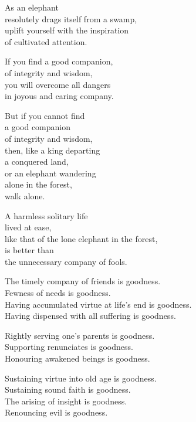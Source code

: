 As an elephant\\
resolutely drags itself from a swamp,\\
uplift yourself with the inspiration\\
of cultivated attention.


If you find a good companion,\\
of integrity and wisdom,\\
you will overcome all dangers\\
in joyous and caring company.


But if you cannot find\\
a good companion\\
of integrity and wisdom,\\
then, like a king departing\\
a conquered land,\\
or an elephant wandering\\
alone in the forest,\\
walk alone.


A harmless solitary life\\
lived at ease,\\
like that of the lone elephant in the forest,\\
is better than\\
the unnecessary company of fools.


The timely company of friends is goodness.\\
Fewness of needs is goodness.\\
Having accumulated virtue at life’s end is goodness.\\
Having dispensed with all suffering is goodness.


Rightly serving one's parents is goodness.\\
Supporting renunciates is goodness.\\
Honouring awakened beings is goodness.


Sustaining virtue into old age is goodness.\\
Sustaining sound faith is goodness.\\
The arising of insight is goodness.\\
Renouncing evil is goodness.


